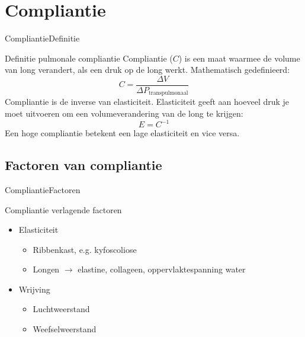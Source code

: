 \documentclass[]{beamer}
\begin{document}
\section{Compliantie}
\begin{frame}{Compliantie}{Definitie}
    \begin{block}{Definitie pulmonale compliantie}
        Compliantie ($C$) is een maat waarmee de volume van long verandert, als een druk op de long werkt. Mathematisch gedefinieerd:
        \begin{equation*}
            C = \frac{\Delta V}{\Delta P_{\text{transpulmonaal}}}
        \end{equation*}
        Compliantie is de inverse van elasticiteit. Elasticiteit geeft aan hoeveel druk je moet uitvoeren om een volumeverandering van de long te krijgen:
        \begin{equation*}
            E = C^{-1}
        \end{equation*}
        Een hoge compliantie betekent een lage elasticiteit en vice versa.
\end{block}
\end{frame}
\subsection{Factoren van compliantie}
\begin{frame}{Compliantie}{Factoren}
    \begin{block}{Compliantie verlagende factoren}
    \begin{itemize}
        \item Elasticiteit
            \begin{itemize}
                \item Ribbenkast, e.g. kyfoscoliose
                \item Longen $\rightarrow$ elastine, collageen, oppervlaktespanning water
            \end{itemize}
        \item Wrijving
            \begin{itemize}
                \item Luchtweerstand
                \item Weefselweerstand
            \end{itemize}
    \end{itemize}
    \end{block}
\end{frame}
\end{document}
